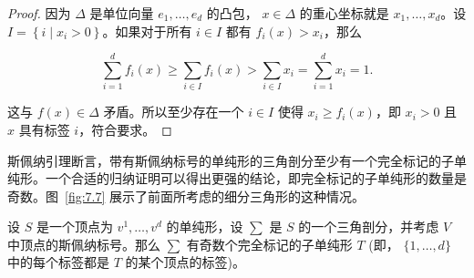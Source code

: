 \begin{proof}
因为 \(\Delta\) 是单位向量 \({e}_{1},\ldots,{e}_{d}\) 的凸包， \(x \in  \Delta\) 的重心坐标就是 \({x}_{1},\ldots,{x}_{d}\)。设 \(I = \left\{  {i \mid  {x}_{i} > 0}\right\}\)。如果对于所有 \(i \in  I\) 都有 \({f}_{i}\left( x\right)  > {x}_{i}\)，那么

\[
\mathop{\sum }\limits_{{i = 1}}^{d}{f}_{i}\left( x\right)  \geq  \mathop{\sum }\limits_{{i \in  I}}{f}_{i}\left( x\right)  > \mathop{\sum }\limits_{{i \in  I}}{x}_{i} = \mathop{\sum }\limits_{{i = 1}}^{d}{x}_{i} = 1.
\]

这与 \(f\left( x\right)  \in  \Delta\) 矛盾。所以至少存在一个 \(i \in  I\) 使得 \({x}_{i} \geq  {f}_{i}\left( x\right)\)，即 \({x}_{i} > 0\) 且 \(x\) 具有标签 \(i\)，符合要求。
\end{proof}

斯佩纳引理断言，带有斯佩纳标号的单纯形的三角剖分至少有一个完全标记的子单纯形。一个合适的归纳证明可以得出更强的结论，即完全标记的子单纯形的数量是奇数。图~\ref{fig:7.7} 展示了前面所考虑的细分三角形的这种情况。

\bigskip
\noindent
\begin{theorem}[斯佩纳引理]\label{theo:7.10}
设 \(S\) 是一个顶点为 \({v}^{1},\ldots,{v}^{d}\) 的单纯形，设 \(\sum\) 是 \(S\) 的一个三角剖分，并考虑 \(V\) 中顶点的斯佩纳标号。那么 \(\sum\) 有奇数个完全标记的子单纯形 \(T\) (即， \(\{ 1,\ldots,d\}\) 中的每个标签都是 \(T\) 的某个顶点的标签)。
\end{theorem}


